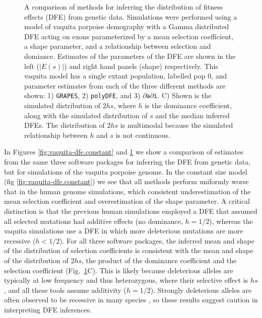 \documentclass[hidelinks]{article}
\newcommand{\polydfe}{\texttt{polyDFE}\xspace}
\newcommand{\dadi}{$\partial$\texttt{a}$\partial$\texttt{i}\xspace}
\newcommand{\grapes}{\texttt{GRAPES}\xspace}
\begin{document}
\begin{figure}
        \caption{
        \label{fig:vaquita-dfe}
        A comparison of methods for inferring the distribution of fitness effects (DFE) from genetic data.
        Simulations were performed using a model of vaquita porpoise demography \citep{robinson2022critically} with a Gamma distributed DFE
        acting on exons parameterized by a mean selection coefficient, a shape parameter, and a relationship between selection and domiance. Estimates of the 
        parameters of the DFE are shown in the left ($\lvert E(s) \rvert $) and right hand panels (shape) respectively.
        This vaquita model has a single extant population, labelled pop 0, and parameter estimates from each
        of the three different methods are shown: 1) \grapes \cite{galtier2016adaptive}, 2) \polydfe \citep{tataru2020polydfe},
        and 3) \dadi \citep{gutenkunst2009inferring,kim2017inference}.
        C) Shown is the simulated distribution of $2 h s$, where $h$ is the dominance coefficient, along with the simulated distribution of $s$ and the median inferred DFEs. The distribution of $2 h s$ is multimodal because the simulated relationship between $h$ and $s$ is not continuous.
        }
    \end{figure}
    
    In Figures \ref{fig:vaquita-dfe.constant} and \ref{fig:vaquita-dfe} we show a comparison of estimates
    from the same three software packages for inferring the DFE from genetic data, but for simulations of the
    vaquita porpoise genome. In the constant size model (fig \ref{fig:vaquita-dfe.constant}) we see that all methods
    perform uniformly worse that in the human genome simulations, which consistent underestimation of the mean selection coefficient    
    and overestimation of the shape parameter. 
A critical distinction is that the previous human simulations employed a DFE that assumed all selected mutations had additive effects (no dominance, $h = 1/2$), whereas the vaquita simulations use a DFE in which more deleterious mutations are more recessive ($h < 1/2$).
For all three software packages, the inferred mean and shape of the distribution of selection coefficients is consistent with the mean and shape of the distribution of $2 h s$, the product of the dominance coefficient and the selection coefficient (Fig.~\ref{fig:vaquita-dfe}C).
This is likely because deleterious alleles are typically at low frequency and thus heterozygous, where their selective effect is $h s$, and all these tools assume additivity  ($h = 1/2$).
Strongly deleterious alleles are often observed to be recessive in many species \citep{}, so these results suggest caution in interpreting DFE inferences.
\end{document}
